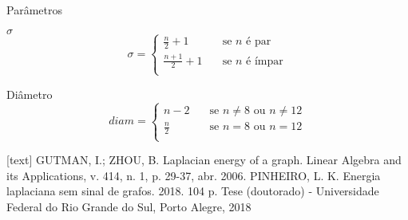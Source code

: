 \documentclass{beamer}
\begin{document}
\begin{frame}{Parâmetros}
    \begin{alertblock}{$\sigma$}
        \[\sigma =
        \begin{cases}
            \text{$\frac{n}{2}+1$} &\quad\text{se $n$ é par}\\
            \text{$\frac{n+1}{2}+1$} &\quad\text{se $n$ é ímpar}\\
        \end{cases}\]
    \end{alertblock}
    
    \begin{alertblock}{Diâmetro}
        \[diam =
        \begin{cases}
            \text{$n-2$} &\quad\text{se $n \ne 8$ ou $n \ne  12$}\\
            \text{$\frac{n}{2}$} &\quad\text{se $n=8$ ou $n=12$}\\
        \end{cases}\]
    \end{alertblock}
\end{frame}

\begin{frame}
    \begin{thebibliography}{5}
        [text]
        GUTMAN, I.; ZHOU, B. Laplacian energy of a graph. Linear Algebra and its Applications, v. 414, n. 1, p. 29-37, abr. 2006.
        PINHEIRO, L. K. Energia laplaciana sem sinal de grafos. 2018. 104 p. Tese (doutorado) - Universidade Federal do Rio Grande do Sul, Porto Alegre, 2018
    \end{thebibliography}
\end{frame}
\end{document}
